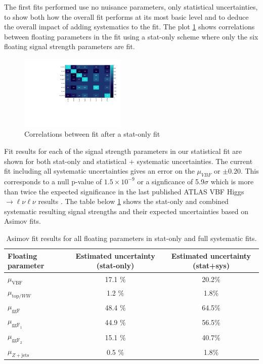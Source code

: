 The first fits performed use no nuisance parameters, only statistical uncertainties, to show both how the overall fit performs at its most basic level and to deduce the overall impact of adding systematics to the fit. The plot \ref{fig:correlations} shows correlations between floating parameters in the fit using a stat-only scheme where only the six floating signal strength parameters are fit.

\begin{figure}[!h]
\centering
\includegraphics[width=0.45\textwidth]{Pictures/fitresults/correlation_stat.pdf}
\caption{Correlations between fit  after a stat-only fit}
\label{fig:correlations}
\end{figure}

Fit results for each of the signal strength parameters in our statistical fit are shown for both stat-only and statistical $+$ systematic uncertainties. The current fit including all systematic uncertainties gives an error on the $\mu_{VBF}$ or $\pm 0.20$. This corresponds to a null p-value of $1.5\times10^{-9}$ or a signficance of 5.9$\sigma$ which is more than twice the expected significance in the last published ATLAS VBF Higgs $\rightarrow \ell\nu\ell\nu$ results \cite{Aaboud_2019}. The table below \ref{tab:muresults} shows the stat-only and combined systematic resulting signal strengths and their expected uncertainties based on Asimov fits. 

\begin{table}[!h]
  \begin{center}
    \begin{tabular}{l|c|c|}
       Floating parameter & Estimated uncertainty (stat-only)    & Estimated uncertainty (stat+sys) \\
      \hline
       $\mu_{\text{VBF}}$ & 17.1 $\%$ & 20.2$\%$ \\
       $\mu_{\text{top/}WW}$ & 1.2 $\%$ & 1.8$\%$\\
       $\mu_{\text{ggF}}$ & 48.4 $\%$ & 64.5$\%$ \\
       $\mu_{\text{ggF}_1}$ & 44.9 $\%$ & 56.5$\%$ \\
       $\mu_{\text{ggF}_2}$ & 15.1 $\%$ & 40.7$\%$ \\
       $\mu_{Z+\text{jets}}$ & 0.5 $\%$ & 1.8$\%$ \\
    \end{tabular}
    \caption{Asimov fit results for all floating parameters in stat-only and full systematic fits.}
    \label{tab:muresults}
  \end{center}
\end{table}

